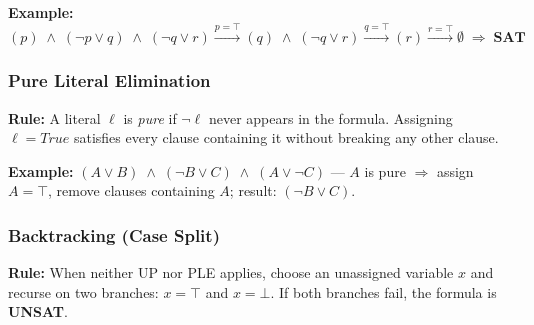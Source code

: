 \documentclass[11pt, a4paper]{article}
\begin{document}
\textbf{Example:}
\[
  (p)\;\land\;(\lnot p \lor q)\;\land\;(\lnot q \lor r)
  \xrightarrow{p=\top}
  (q)\;\land\;(\lnot q \lor r)
  \xrightarrow{q=\top}
  (r)
  \xrightarrow{r=\top}
  \emptyset \;\Rightarrow\; \textbf{SAT}
\]

\subsubsection{Pure Literal Elimination}

\begin{tcolorbox}[infostyle]
\textbf{Rule:} A literal $\ell$ is \emph{pure} if $\lnot\ell$ never appears
in the formula.  Assigning $\ell = \textit{True}$ satisfies every clause
containing it without breaking any other clause.
\end{tcolorbox}

\textbf{Example:}
$(A \lor B)\;\land\;(\lnot B \lor C)\;\land\;(A \lor \lnot C)$
\;—\; $A$ is pure $\Rightarrow$ assign $A = \top$, remove clauses
containing $A$; result: $(\lnot B \lor C)$.

\subsubsection{Backtracking (Case Split)}

\begin{tcolorbox}[infostyle]
\textbf{Rule:} When neither UP nor PLE applies, choose an unassigned variable
$x$ and recurse on two branches: $x = \top$ and $x = \bot$.
If both branches fail, the formula is \textbf{UNSAT}.
\end{tcolorbox}

\end{document}
